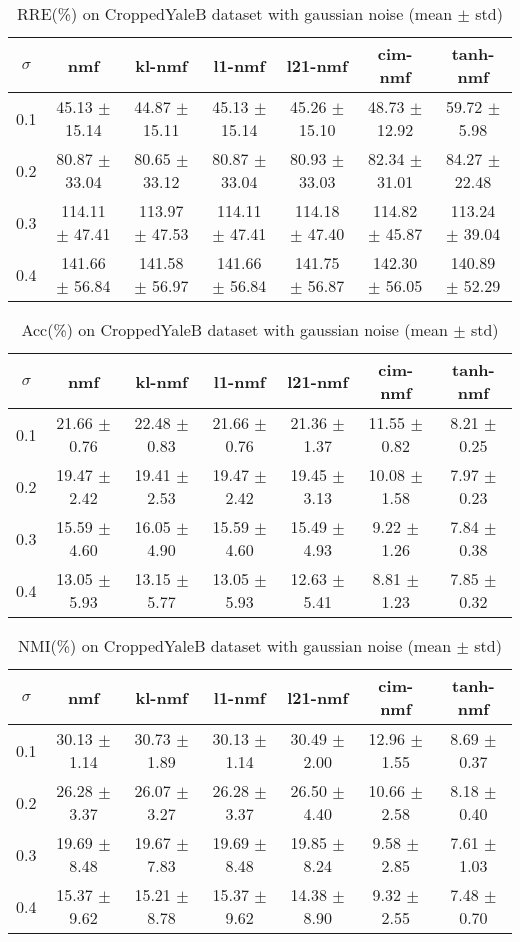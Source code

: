 \documentclass{article} %
\begin{document}
\begin{table}[H]
\begin{tabular}{c|cccccc}$\sigma$ & nmf & kl-nmf & l1-nmf & l21-nmf & cim-nmf & tanh-nmf \\\hline
0.1 & 45.13 $\pm$ 15.14 & 44.87 $\pm$ 15.11 & 45.13 $\pm$ 15.14 & 45.26 $\pm$ 15.10 & 48.73 $\pm$ 12.92 & 59.72 $\pm$ 5.98 \\
0.2 & 80.87 $\pm$ 33.04 & 80.65 $\pm$ 33.12 & 80.87 $\pm$ 33.04 & 80.93 $\pm$ 33.03 & 82.34 $\pm$ 31.01 & 84.27 $\pm$ 22.48 \\
0.3 & 114.11 $\pm$ 47.41 & 113.97 $\pm$ 47.53 & 114.11 $\pm$ 47.41 & 114.18 $\pm$ 47.40 & 114.82 $\pm$ 45.87 & 113.24 $\pm$ 39.04 \\
0.4 & 141.66 $\pm$ 56.84 & 141.58 $\pm$ 56.97 & 141.66 $\pm$ 56.84 & 141.75 $\pm$ 56.87 & 142.30 $\pm$ 56.05 & 140.89 $\pm$ 52.29 \\
\end{tabular}\caption{
  RRE(\%) on CroppedYaleB dataset with gaussian noise (mean $\pm$ std)
  \label{tab:RRE-CroppedYaleB-gaussian}
}\end{table}
\begin{table}[H]
\begin{tabular}{c|cccccc}$\sigma$ & nmf & kl-nmf & l1-nmf & l21-nmf & cim-nmf & tanh-nmf \\\hline
0.1 & 21.66 $\pm$ 0.76 & 22.48 $\pm$ 0.83 & 21.66 $\pm$ 0.76 & 21.36 $\pm$ 1.37 & 11.55 $\pm$ 0.82 & 8.21 $\pm$ 0.25 \\
0.2 & 19.47 $\pm$ 2.42 & 19.41 $\pm$ 2.53 & 19.47 $\pm$ 2.42 & 19.45 $\pm$ 3.13 & 10.08 $\pm$ 1.58 & 7.97 $\pm$ 0.23 \\
0.3 & 15.59 $\pm$ 4.60 & 16.05 $\pm$ 4.90 & 15.59 $\pm$ 4.60 & 15.49 $\pm$ 4.93 & 9.22 $\pm$ 1.26 & 7.84 $\pm$ 0.38 \\
0.4 & 13.05 $\pm$ 5.93 & 13.15 $\pm$ 5.77 & 13.05 $\pm$ 5.93 & 12.63 $\pm$ 5.41 & 8.81 $\pm$ 1.23 & 7.85 $\pm$ 0.32 \\
\end{tabular}\caption{
  Acc(\%) on CroppedYaleB dataset with gaussian noise (mean $\pm$ std)
  \label{tab:Acc-CroppedYaleB-gaussian}
}\end{table}
\begin{table}[H]
\begin{tabular}{c|cccccc}$\sigma$ & nmf & kl-nmf & l1-nmf & l21-nmf & cim-nmf & tanh-nmf \\\hline
0.1 & 30.13 $\pm$ 1.14 & 30.73 $\pm$ 1.89 & 30.13 $\pm$ 1.14 & 30.49 $\pm$ 2.00 & 12.96 $\pm$ 1.55 & 8.69 $\pm$ 0.37 \\
0.2 & 26.28 $\pm$ 3.37 & 26.07 $\pm$ 3.27 & 26.28 $\pm$ 3.37 & 26.50 $\pm$ 4.40 & 10.66 $\pm$ 2.58 & 8.18 $\pm$ 0.40 \\
0.3 & 19.69 $\pm$ 8.48 & 19.67 $\pm$ 7.83 & 19.69 $\pm$ 8.48 & 19.85 $\pm$ 8.24 & 9.58 $\pm$ 2.85 & 7.61 $\pm$ 1.03 \\
0.4 & 15.37 $\pm$ 9.62 & 15.21 $\pm$ 8.78 & 15.37 $\pm$ 9.62 & 14.38 $\pm$ 8.90 & 9.32 $\pm$ 2.55 & 7.48 $\pm$ 0.70 \\
\end{tabular}\caption{
  NMI(\%) on CroppedYaleB dataset with gaussian noise (mean $\pm$ std)
  \label{tab:NMI-CroppedYaleB-gaussian}
}\end{table}
\end{document}
